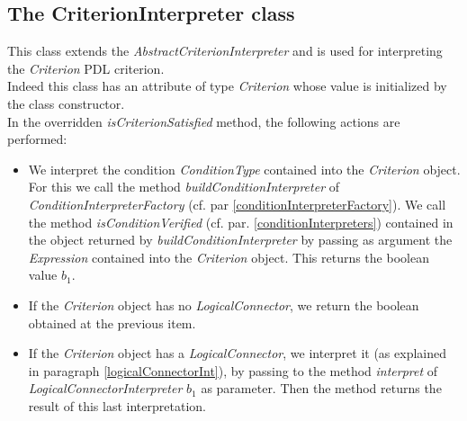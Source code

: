 \documentclass[a4paper,11pt] {ivoa}
\begin{document}
\subsection{The CriterionInterpreter class}
This class  extends the  {\it AbstractCriterionInterpreter} and is used for interpreting the {\it Criterion} PDL criterion. \\
Indeed this class has an attribute of type {\it Criterion} whose value is initialized by the class constructor. \\
In the overridden {\it isCriterionSatisfied} method, the following actions are performed:
\begin{itemize}
\item We interpret the condition {\it ConditionType} contained into the {\it Criterion} object.
For this we call the method {\it buildConditionInterpreter} of  {\it ConditionInterpreterFactory} (cf. par \ref{conditionInterpreterFactory}). We call the method {\it isConditionVerified} (cf. par. \ref{conditionInterpreters}) contained in the object returned by {\it buildConditionInterpreter} by passing as argument the {\it Expression} contained into the {\it Criterion} object. This returns the boolean value $b_1$.
\item If the {\it Criterion} object has no {\it LogicalConnector}, we return the boolean obtained at the previous item. 
\item If the {\it Criterion} object has a {\it LogicalConnector}, we interpret it (as explained in paragraph \ref{logicalConnectorInt}), by passing to the method {\it interpret} of {\it LogicalConnectorInterpreter}  $b_1$ as parameter. Then the method returns the result of this last interpretation.
\end{itemize}
\end{document}
